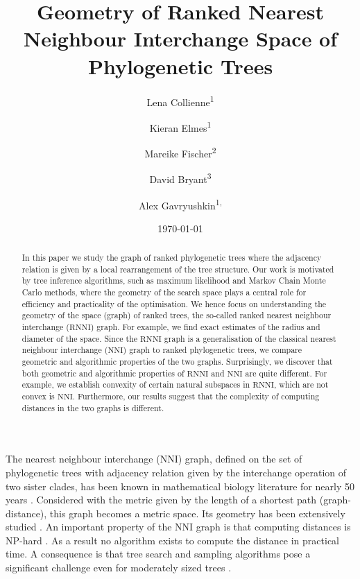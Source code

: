 \documentclass{amsart}
\title[Ranked Nearest Neighbour Intarchange]{Geometry of Ranked Nearest Neighbour Interchange Space of Phylogenetic Trees}
\date{\today}
\author{Lena Collienne\textsuperscript{1}}
\author{Kieran Elmes\textsuperscript{1}}
\author{Mareike Fischer\textsuperscript{2}}
\author{David Bryant\textsuperscript{3}}
\author{Alex Gavryushkin\textsuperscript{1, \Letter}}
\newcommand{\nni}{\mathrm{NNI}}
\newcommand{\rnni}{\mathrm{RNNI}}
\begin{document}
\begin{abstract}
In this paper we study the graph of ranked phylogenetic trees where the adjacency relation is given by a local rearrangement of the tree structure.
Our work is motivated by tree inference algorithms, such as maximum likelihood and Markov Chain Monte Carlo methods, where the geometry of the search space plays a central role for efficiency and practicality of the optimisation.
We hence focus on understanding the geometry of the space (graph) of ranked trees, the so-called ranked nearest neighbour interchange ($\rnni$) graph.
For example, we find exact estimates of the radius and diameter of the space.
Since the $\rnni$ graph is a generalisation of the classical nearest neighbour interchange ($\nni$) graph to ranked phylogenetic trees, we compare geometric and algorithmic properties of the two graphs.
Surprisingly, we discover that both geometric and algorithmic properties of $\rnni$ and $\nni$ are quite different.
For example, we establish convexity of certain natural subspaces in $\rnni$, which are not convex is $\nni$.
Furthermore, our results suggest that the complexity of computing distances in the two graphs is different.
\end{abstract}


\maketitle

The nearest neighbour interchange ($\nni$) graph, defined on the set of phylogenetic trees with adjacency relation given by the interchange operation of two sister clades, has been known in mathematical biology literature for nearly 50 years \autocite{Robinson1971-ql,Moore1973-kk}.
Considered with the metric given by the length of a shortest path (graph-distance), this graph becomes a metric space.
Its geometry has been extensively studied \autocite{Dasgupta2000-xa, Li1996-zw, Gordon2013-fw, De_Jong2016-al}.
An important property of the $\nni$ graph is that computing distances is NP-hard \autocite{Dasgupta2000-xa}.
As a result no algorithm exists to compute the distance in practical time.
A consequence is that tree search and sampling algorithms pose a significant challenge even for moderately sized trees
\autocite{Whidden2016-kl}.
\end{document}

